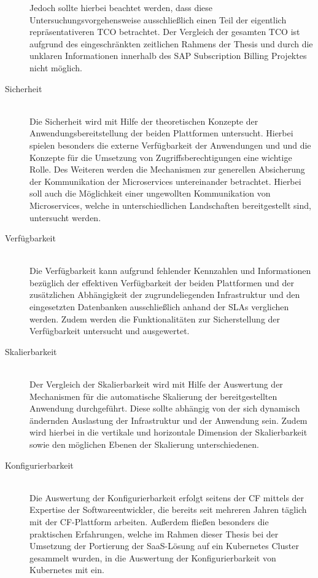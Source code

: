 \begin{description}
	Jedoch sollte hierbei beachtet werden, dass diese Untersuchungsvorgehensweise ausschließlich einen Teil der eigentlich repräsentativeren \ac{TCO} betrachtet. Der Vergleich der gesamten \ac{TCO} ist aufgrund des eingeschränkten zeitlichen Rahmens der Thesis und durch die unklaren Informationen innerhalb des SAP Subscription Billing Projektes nicht möglich.
	\item[Sicherheit] \hfill \\
	Die Sicherheit wird mit Hilfe der theoretischen Konzepte der Anwendungsbereitstellung der beiden Plattformen untersucht. Hierbei spielen besonders die externe Verfügbarkeit der Anwendungen und und die Konzepte für die Umsetzung von Zugriffsberechtigungen eine wichtige Rolle. Des Weiteren werden die Mechanismen zur generellen Absicherung der Kommunikation der Microservices untereinander betrachtet. Hierbei soll auch die Möglichkeit einer ungewollten Kommunikation von Microservices, welche in unterschiedlichen Landschaften bereitgestellt sind, untersucht werden. 
	\item[Verfügbarkeit] \hfill \\
	Die Verfügbarkeit kann aufgrund fehlender Kennzahlen und Informationen bezüglich der effektiven Verfügbarkeit der beiden Plattformen und der zusätzlichen Abhängigkeit der zugrundeliegenden Infrastruktur und den eingesetzten Datenbanken ausschließlich anhand der \acsp{SLA} verglichen werden. Zudem werden die Funktionalitäten zur Sicherstellung der Verfügbarkeit untersucht und ausgewertet.
	\item[Skalierbarkeit] \hfill \\
	Der Vergleich der Skalierbarkeit wird mit Hilfe der Auswertung der Mechanismen für die automatische Skalierung der bereitgestellten Anwendung durchgeführt. Diese sollte abhängig von der sich dynamisch ändernden Auslastung der Infrastruktur und der Anwendung sein. Zudem wird hierbei in die vertikale und horizontale Dimension der Skalierbarkeit sowie den möglichen Ebenen der Skalierung unterschiedenen.
	\item[Konfigurierbarkeit] \hfill \\
	Die Auswertung der Konfigurierbarkeit erfolgt seitens der \ac{CF} mittels der Expertise der Softwareentwickler, die bereits seit mehreren Jahren täglich mit der \ac{CF}-Plattform arbeiten. Außerdem fließen besonders die praktischen Erfahrungen, welche im Rahmen dieser Thesis bei der Umsetzung der Portierung der \ac{SaaS}-Lösung auf ein Kubernetes Cluster gesammelt wurden, in die Auswertung der Konfigurierbarkeit von Kubernetes mit ein. 

\end{description}
